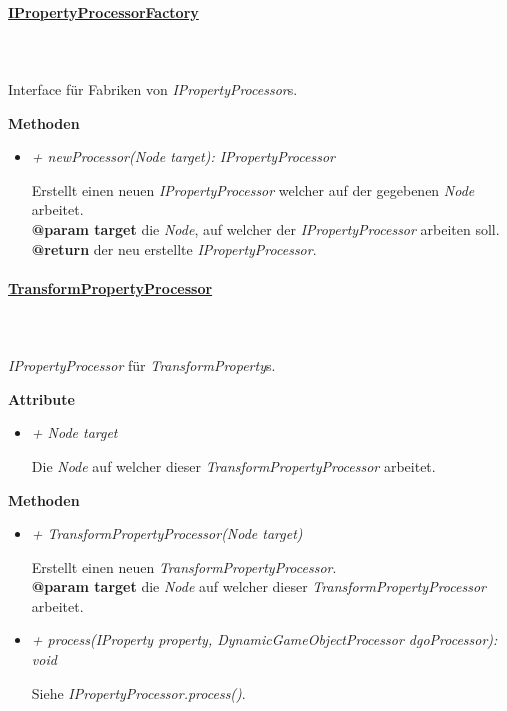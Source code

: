     \pagebreak
    \paragraph{\underline{IPropertyProcessorFactory}} \mbox{}\\
    \\
    Interface für Fabriken von \textit{IPropertyProcessor}s.\par

        \textbf{Methoden}
        \begin{itemize}
            \item \textit{+ newProcessor(Node target): IPropertyProcessor}
                \begin{leftbar}[0.9\linewidth]
                    Erstellt einen neuen \textit{IPropertyProcessor} welcher auf der gegebenen \textit{Node} arbeitet.\\
                    \textbf{@param target} die \textit{Node}, auf welcher der \textit{IPropertyProcessor} arbeiten soll.
                    \textbf{@return} der neu erstellte \textit{IPropertyProcessor}.
                \end{leftbar}
        \end{itemize}

    \paragraph{\underline{TransformPropertyProcessor}} \mbox{}\\
    \\
    \textit{IPropertyProcessor} für \textit{TransformProperty}s.\par

        \textbf{Attribute}
        \begin{itemize}
            \item \textit{+ Node target}
                \begin{leftbar}[0.9\linewidth]
                    Die \textit{Node} auf welcher dieser \textit{TransformPropertyProcessor} arbeitet.
                \end{leftbar}
        \end{itemize}
        \textbf{Methoden}
        \begin{itemize}
            \item \textit{+ TransformPropertyProcessor(Node target)}
                \begin{leftbar}[0.9\linewidth]
                    Erstellt einen neuen \textit{TransformPropertyProcessor}.\\
                    \textbf{@param target} die \textit{Node} auf welcher dieser \textit{TransformPropertyProcessor} arbeitet.
                \end{leftbar}
            \item \textit{+ process(IProperty property, DynamicGameObjectProcessor dgoProcessor): void}
                \begin{leftbar}[0.9\linewidth]
                    Siehe \textit{IPropertyProcessor.process()}.
                \end{leftbar}
        \end{itemize}

